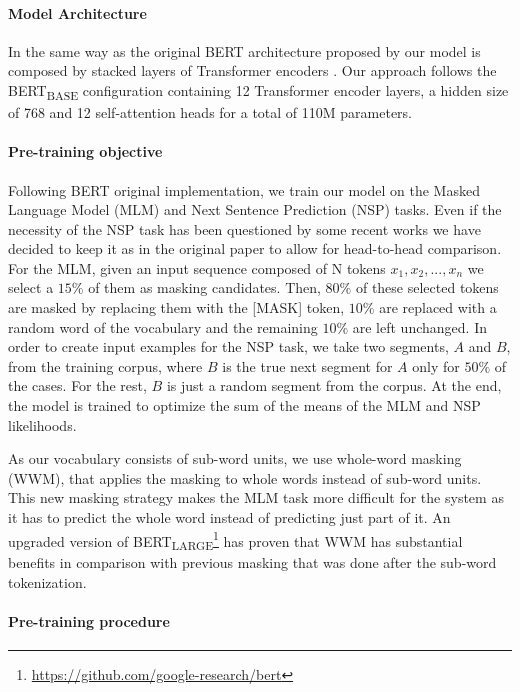 \documentclass[10pt, a4paper]{article}
\begin{document}
\paragraph{Model Architecture}

In the same way as the original BERT architecture proposed by  our model is composed by stacked layers of Transformer encoders \cite{vaswani2017attention}. Our approach follows the BERT\textsubscript{BASE} configuration containing 12 Transformer encoder layers, a hidden size of 768 and 12 self-attention heads for a total of 110M parameters.

\paragraph{Pre-training objective}

Following BERT original implementation, we train our model on the Masked Language Model (MLM) and Next Sentence Prediction (NSP) tasks. Even if the necessity of the NSP task has been questioned by some recent works \cite{yang2019xlnet,liu2019roberta,lample2019cross} we have decided to keep it as in the original paper to allow for head-to-head comparison. For the MLM, given an input sequence composed of N tokens $x_1, x_2, ..., x_n$ we select a $15\%$ of them as masking candidates. Then, $80\%$ of these selected tokens are masked by replacing them with the [MASK] token, $10\%$ are replaced with a random word of the vocabulary and the remaining $10\%$ are left unchanged. In order to create input examples for the NSP task, we take two segments, $A$ and $B$, from the training corpus, where $B$ is the true next segment for $A$ only for $50\%$ of the cases. For the rest, $B$ is just a random segment from the corpus. At the end, the model is trained to optimize the sum of the means of the MLM and NSP likelihoods.

As our vocabulary consists of sub-word units, we use whole-word masking (WWM), that applies the masking to whole words instead of sub-word units. This new masking strategy makes the MLM task more difficult for the system as it has to predict the whole word instead of predicting just part of it. An upgraded version of BERT\textsubscript{LARGE}\footnote{\scriptsize{\url{https://github.com/google-research/bert}}} has proven that WWM has substantial benefits in comparison with previous masking that was done after the sub-word tokenization.

\paragraph{Pre-training procedure}
\end{document}
